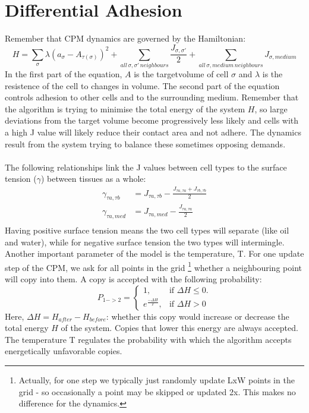 \documentclass[a4paper,10pt]{article}
\begin{document}
\section{Differential Adhesion}
Remember that CPM dynamics are governed by the Hamiltonian:
$$ H = \sum_\sigma \lambda ( a_\sigma - A_{\tau(\sigma)}  )^2 + \sum_{all\,\sigma,\sigma'\,neighbours} \frac{J_{\sigma,\sigma'}}{2}+ \sum_{all\,\sigma,medium\,neighbours} J_{\sigma,medium}$$
In the first part of the equation,  $A$ is the targetvolume of cell $\sigma$ and $\lambda$ is the resistence of the cell to changes in volume. 
The second part of the equation controls adhesion to other cells and to the surrounding medium. Remember that the algorithm is trying to minimise the 
total energy of the system $H$, so large deviations from the target volume become progressively less likely and cells with a high J value will likely 
reduce their contact area and not adhere. The dynamics result from the system trying to balance these sometimes opposing demands.
\paragraph{}
The following relationships link the J values between cell types to the surface tension ($\gamma$) between tissues as a whole:
\begin{equation}
\begin{align}
 \gamma_{\tau a,\tau b} &= J_{\tau a,\tau b}-\frac{J_{\tau a,\tau a}+J_{\tau b,\tau b}}{2}\\
 \gamma_{\tau a,med} &= J_{\tau a,med}-\frac{J_{\tau a,\tau a}}{2}\\
\end{align}
\end{equation}
Having positive surface tension means the two cell types will separate (like oil and water), while for negative surface tension the two types will 
intermingle.
\\
Another important parameter of the model is the temperature, T. For one update step of the CPM, we ask for all points in the grid \footnote{Actually, for one step we typically just randomly update LxW points in the grid - so occasionally a point may be skipped or updated 2x. This makes no difference for the dynamics.} whether a neighbouring point will copy into them.
A copy is accepted with the following probability:
\begin{equation}
P_{1->2}=\begin{cases}
    1, & \text{if $\Delta H \leq 0$}.\\
    e^{\frac{-\Delta H}{T}}, & \text{if $\Delta H>0$}
  \end{cases}
\end{equation}
Here, $\Delta H = H_{after}-H_{before}$: whether this copy would increase or decrease the total energy $H$ of the system. Copies that lower this energy are always accepted. 
The temperature T regulates the probability with which the algorithm accepts energetically unfavorable copies.
\end{document}
